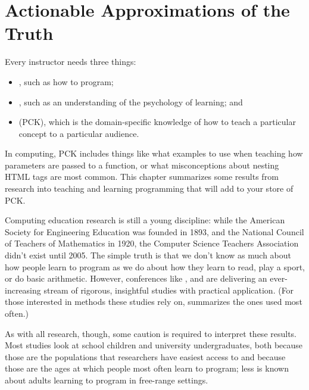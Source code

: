 \chapter{Actionable Approximations of the Truth}\label{s:pck}

Every instructor needs three things:

\begin{itemize}
\item
  , such as how to
  program;
\item
  ,
  such as an understanding of the psychology of learning; and
\item
  (PCK), which is the domain-specific knowledge of how to teach a
  particular concept to a particular audience.
\end{itemize}

In computing, PCK includes things like what examples to use when
teaching how parameters are passed to a function, or what misconceptions
about nesting HTML tags are most common. This chapter summarizes some
results from research into teaching and learning programming that will
add to your store of PCK.

Computing education research is still a young discipline: while the
American Society for Engineering Education was founded in 1893, and
the National Council of Teachers of Mathematics in 1920, the Computer
Science Teachers Association didn't exist until 2005. The simple truth
is that we don't know as much about how people learn to program as we
do about how they learn to read, play a sport, or do basic arithmetic.
However, conferences like ,  and
 are delivering an ever-increasing stream of rigorous,
insightful studies with practical application. (For those interested
in methods these studies rely on, \cite{Ihan2016} summarizes the
ones used most often.)

As with all research, though, some caution is required to interpret
these results. Most studies look at school children and university
undergraduates, both because those are the populations that researchers
have easiest access to \cite{Henr2010} and because those are the ages
at which people most often learn to program; less is known about adults
learning to program in free-range settings.

